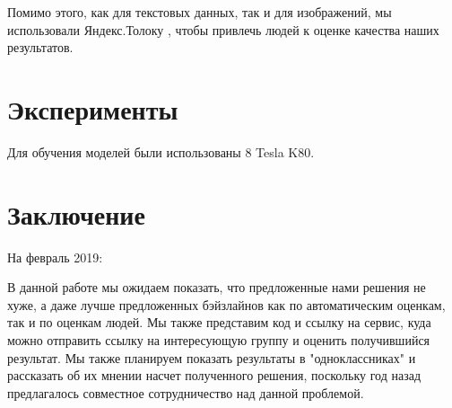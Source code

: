 \documentclass[aps,%
12pt,%
final,%
oneside,
onecolumn,%
musixtex, %
superscriptaddress,%
centertags]{article} %
\begin{document}
Помимо этого, как для текстовых данных, так и для изображений, мы  использовали
Яндекс.Толоку \cite{yandex_toloka_2019}, чтобы привлечь людей к оценке качества наших результатов.

\section{Эксперименты}
Для обучения моделей были использованы 8 Tesla K80.

\section{Заключение}
На февраль 2019:

В данной работе мы ожидаем показать, что предложенные нами решения не хуже,
а даже лучше предложенных бэйзлайнов как по автоматическим оценкам, так и по оценкам
людей. Мы также представим код и ссылку на сервис, куда можно отправить ссылку на
интересующую группу и оценить получившийся результат. Мы также планируем показать
результаты в "одноклассниках" и рассказать об их мнении насчет полученного решения,
поскольку год назад предлагалось совместное сотрудничество над данной проблемой.



\end{document}
